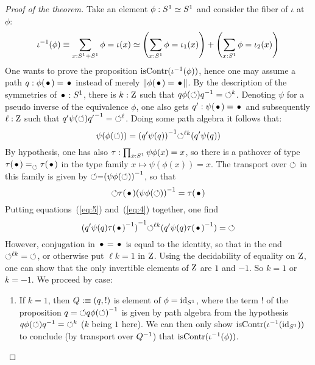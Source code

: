 \documentclass[english,a4paper]{tufte-handout}
\begin{document}
\begin{proof}[Proof of the theorem]
  Take an element $\phi : {S^1} \simeq {S^1}$ and consider the fiber of
  $\iota$ at $\phi$:
  \begin{equation}
    \label{eq:fiber-iota-two-components}%
    \inv\iota(\phi) \jdeq \sum_{x:\Sc+\Sc} \phi = \iota(x)
    \weq \left(\sum_{x:\Sc}\phi = \iota_1(x)\right) +
    \left(\sum_{x:\Sc}\phi = \iota_2(x)\right)
  \end{equation}
  One wants to prove the proposition $\mathrm{isContr}({\iota}^{-1}(\phi))$,
  hence one may assume a path $q:\phi(\base) = \base$ instead of
  merely $\Trunc{\phi(\base) = \base}$. By the description of the
  symmetries of $\base:\Sc$, there is $k:\mathrm{Z}$ such that
  $q\phi(\mathord{\circlearrowleft}){q}^{-1} = \mathord{\circlearrowleft}^k$. Denoting $\psi$ for a pseudo
  inverse of the equivalence $\phi$, one also gets
  $q':\psi(\base) = \base$ and subsequently $\ell:\mathrm{Z}$ such that
  $q'\psi(\mathord{\circlearrowleft}){q'}^{-1} = \mathord{\circlearrowleft}^\ell$. Doing some path algebra it
  follows that:
  \begin{equation}
    \label{eq:4}
    \psi(\phi(\mathord{\circlearrowleft})) = {(q' \psi(q))}^{-1}\mathord{\circlearrowleft}^{\ell k} (q' \psi(q))
  \end{equation}
  By hypothesis, one has also $\tau : \prod_{x:{S^1}}\psi\phi(x) = x$,
  so there is a pathover of type
  $\pathover {\tau(\base)} {} \Sloop {\tau(\base)}$ in the type family
  $x \mapsto \psi(\phi(x)) = x$. The transport over $\mathord{\circlearrowleft}$ in this
  family is given by $\mathord{\circlearrowleft} \mathord{-} {(\psi\phi(\mathord{\circlearrowleft}))}^{-1}$, so that
  \begin{equation}
    \label{eq:5}
    \Sloop \tau(\base) \inv{(\psi\phi(\Sloop))} = \tau(\base)
  \end{equation}
  Putting equations~(\ref{eq:5}) and~(\ref{eq:4}) together, one find
  \begin{equation}
    \label{eq:6}
    \inv{(q' \psi(q) \inv{\tau(\base)})} \Sloop^{\ell k} (q' \psi(q) \inv{\tau(\base)}) = \Sloop
  \end{equation}
  However, conjugation in $\base = \base$ is equal to the identity, so
  that in the end $\mathord{\circlearrowleft}^{\ell k} = \mathord{\circlearrowleft}$, or otherwise put
  $\ell k = 1$ in $\mathrm{Z}$. Using the decidability of equality on
  $\mathrm{Z}$, one can show that the only invertible elements of $\mathrm{Z}$ are
  $1$ and $-1$. So $k = 1$ or $k = -1$. We proceed by case:
  \begin{enumerate}
  \item If $k=1$, then $Q \mathrel{\hbox{:}\mkern-5mu\equiv} (q, !)$ is element of
    $\phi = \mathord{\mathrm{id}}_{S^1}$, where the term $!$ of the proposition
    $q=\mathord{\circlearrowleft} q {\phi(\mathord{\circlearrowleft})}^{-1}$ is given by path algebra from the
    hypothesis $q\phi(\mathord{\circlearrowleft}){q}^{-1}=\mathord{\circlearrowleft}^k$ ($k$ being $1$ here). We
    can then only show $\mathrm{isContr}({\iota}^{-1}(\mathord{\mathrm{id}}_{S^1}))$ to conclude (by
    transport over ${Q}^{-1}$) that $\mathrm{isContr}({\iota}^{-1}(\phi))$. 


\end{enumerate}
\end{proof}
\end{document}
